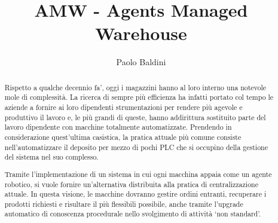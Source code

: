 \documentclass{scrartcl}
\title{\LARGE
    AMW - Agents Managed Warehouse
}
\author{
    Paolo Baldini \\ \emailaddr{paolo.baldini6@studio.unibo.it}
}
\newcommand{\parag}{\vspace{6pt}\par}
\begin{document}
\maketitle


\begin{abstract}
Rispetto a qualche decennio fa', oggi i magazzini hanno al loro interno una notevole mole di complessità. La ricerca di sempre più efficienza ha infatti portato col tempo le aziende a fornire ai loro dipendenti strumentazioni per rendere più agevole e produttivo il lavoro e, le più grandi di queste, hanno addirittura sostituito parte del lavoro dipendente con macchine totalmente automatizzate. Prendendo in considerazione quest’ultima casistica, la pratica attuale più comune consiste nell’automatizzare il deposito per mezzo di pochi PLC che si occupino della gestione del sistema nel suo complesso.

\parag
Tramite l'implementazione di un sistema in cui ogni macchina appaia come un agente robotico, si vuole fornire un’alternativa distribuita alla pratica di centralizzazione attuale. In questa visione, le macchine dovranno gestire ordini entranti, recuperare i prodotti richiesti e risultare il più flessibili possibile, anche tramite l'upgrade automatico di conoscenza procedurale nello svolgimento di attività `non standard'.
\end{abstract}
\newpage

\tableofcontents
\newpage


















\nocite{*} %


\end{document}
